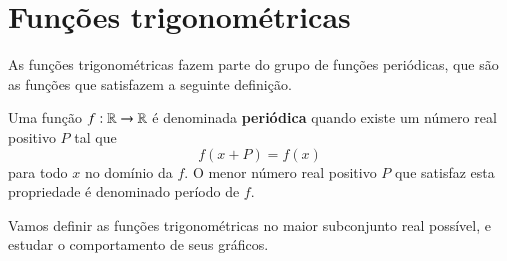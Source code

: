   \section{Funções trigonométricas}

  As funções trigonométricas fazem parte do grupo de funções periódicas, que são as funções que satisfazem a seguinte definição.

  \begin{defi}
   Uma função $f: \mathbb{R} \rightarrow \mathbb{R}$ é denominada \textbf{periódica} quando existe um número real positivo $P$ tal que
   \[f(x + P)= f(x)\]
   para todo $x$ no domínio da $f$. O menor número real positivo $P$ que satisfaz esta propriedade é denominado período de $f$.
  \end{defi}

  Vamos definir as funções trigonométricas no maior subconjunto real possível, e estudar o comportamento de seus gráficos.


